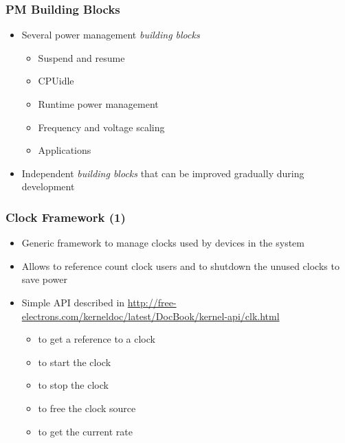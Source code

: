 \begin{frame}
  \frametitle{PM Building Blocks}
  \begin{itemize}
  \item Several power management \emph{building blocks}
    \begin{itemize}
    \item Suspend and resume
    \item CPUidle
    \item Runtime power management
    \item Frequency and voltage scaling
    \item Applications
    \end{itemize}
  \item Independent \emph{building blocks} that can be improved
    gradually during development
  \end{itemize}
\end{frame}

\begin{frame}
  \frametitle{Clock Framework (1)}
  \begin{itemize}
  \item Generic framework to manage clocks used by devices in the
    system
  \item Allows to reference count clock users and to shutdown the
    unused clocks to save power
  \item Simple API described in
    \url{http://free-electrons.com/kerneldoc/latest/DocBook/kernel-api/clk.html}
    \begin{itemize}
    \item {} to get a reference to a clock
    \item {} to start the clock
    \item {} to stop the clock
    \item {} to free the clock source
    \item {} to get the current rate
    \end{itemize}
  \end{itemize}
\end{frame}

